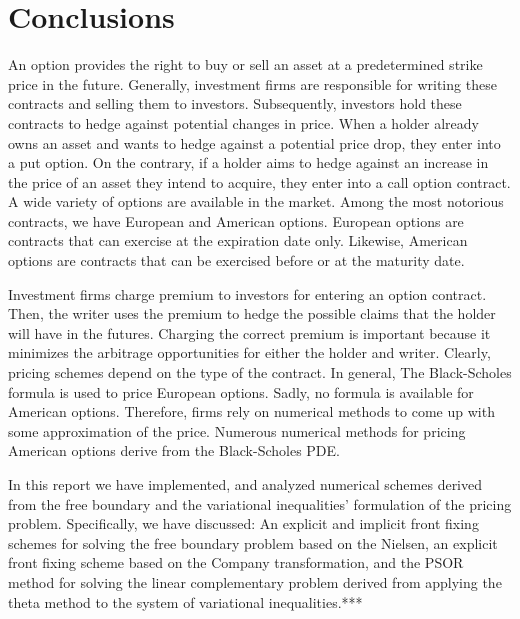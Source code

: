 \section{Conclusions}

An option provides the right to buy or sell an asset at a predetermined strike price in the future. Generally, investment firms are responsible for writing these contracts and selling them to investors. Subsequently, investors hold these contracts to hedge against potential changes in price. When a holder already owns an asset and wants to hedge against a potential price drop, they enter into a put option. On the contrary, if a holder aims to hedge against an increase in the price of an asset they intend to acquire, they enter into a call option contract. A wide variety of options are available in the market. Among the most notorious contracts, we have European and American options. European options are contracts that can exercise at the expiration date only. Likewise, American options are contracts that can be exercised before or at the maturity date. 

Investment firms charge premium to investors for entering an option contract. Then, the writer uses the premium to hedge the possible claims that the holder will have in the futures. Charging the correct premium is important because it minimizes the arbitrage opportunities for either the holder and writer. Clearly, pricing schemes depend on the type of the contract. In general, The Black-Scholes formula is used to price European options. Sadly, no formula is available for American options. Therefore, firms rely on numerical methods to come up with some approximation of the price. Numerous numerical methods for pricing American options derive from the Black-Scholes PDE. 

In this report we have implemented, and analyzed numerical schemes derived from the free boundary and the variational inequalities' formulation of the pricing problem. Specifically, we have discussed: An explicit and implicit front fixing schemes for solving the free boundary problem based on the Nielsen, an explicit front fixing scheme based on the Company transformation, and the PSOR method for solving the linear complementary problem derived from applying the theta method to the system of variational inequalities.***

